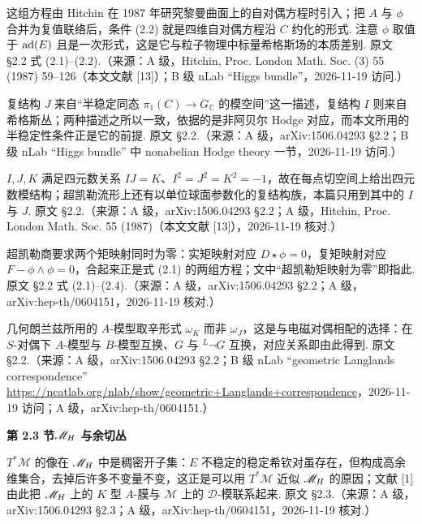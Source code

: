 \begin{description}[leftmargin=5.8em,labelwidth=5em,labelsep=0.6em,itemsep=0.15ex,topsep=0.2ex]
\item[2.2-1] 这组方程由 Hitchin 在 1987 年研究黎曼曲面上的自对偶方程时引入；把 $A$ 与 $\phi$ 合并为复值联络后，条件 (2.2) 就是四维自对偶方程沿 $C$ 约化的形式. 注意 $\phi$ 取值于 ${\mathrm{ad}(E)}$ 且是一次形式，这是它与粒子物理中标量希格斯场的本质差别. 原文 §2.2 式 (2.1)–(2.2).（来源：A 级，Hitchin, Proc. London Math. Soc. (3) 55 (1987) 59–126（本文文献 [13]）；B 级 nLab “Higgs bundle”，2026-11-19 访问.）
\item[2.2-2] 复结构 $J$ 来自“半稳定同态 $\pi_1(C)\to G_{\mathbb C}$ 的模空间”这一描述，复结构 $I$ 则来自希格斯丛；两种描述之所以一致，依据的是非阿贝尔 Hodge 对应，而本文所用的半稳定性条件正是它的前提. 原文 §2.2.（来源：A 级，arXiv:1506.04293 §2.2；B 级 nLab “Higgs bundle” 中 nonabelian Hodge theory 一节，2026-11-19 访问.）
\item[2.2-3] $I,J,K$ 满足四元数关系 $IJ=K$、$I^2=J^2=K^2=-1$，故在每点切空间上给出四元数模结构；超凯勒流形上还有以单位球面参数化的复结构族，本篇只用到其中的 $I$ 与 $J$. 原文 §2.2.（来源：A 级，arXiv:1506.04293 §2.2；A 级，Hitchin, Proc. London Math. Soc. 55 (1987)（本文文献 [13]），2026-11-19 核对.）
\item[2.2-4] 超凯勒商要求两个矩映射同时为零：实矩映射对应 $D\star\phi=0$，复矩映射对应 $F-\phi\wedge\phi=0$，合起来正是式 (2.1) 的两组方程；文中“超凯勒矩映射为零”即指此. 原文 §2.2 式 (2.1)–(2.4).（来源：A 级，arXiv:1506.04293 §2.2；A 级，arXiv:hep-th/0604151，2026-11-19 核对.）
\item[2.2-5] 几何朗兰兹所用的 $A$-模型取辛形式 $\omega_K$ 而非 $\omega_J$，这是与电磁对偶相配的选择：在 $S$-对偶下 $A$-模型与 $B$-模型互换、$G$ 与 $^L\neg G$ 互换，对应关系即由此得到. 原文 §2.2.（来源：A 级，arXiv:1506.04293 §2.2；B 级 nLab “geometric Langlands correspondence” \url{https://ncatlab.org/nlab/show/geometric+Langlands+correspondence}，2026-11-19 访问；A 级，arXiv:hep-th/0604151.）
\end{description}
\medskip\noindent\textbf{第 2.3 节\quad ${{\mathscr{M}}_H}$ 与余切丛}\par\nopagebreak
\begin{description}[leftmargin=5.8em,labelwidth=5em,labelsep=0.6em,itemsep=0.15ex,topsep=0.2ex]
\item[2.3-1] $T^*\mathcal M$ 的像在 ${{\mathscr{M}}_H}$ 中是稠密开子集：$E$ 不稳定的稳定希钦对虽存在，但构成高余维集合，去掉后许多不变量不变，这正是可以用 $T^*\mathcal M$ 近似 ${{\mathscr{M}}_H}$ 的原因；文献 [1] 由此把 ${{\mathscr{M}}_H}$ 上的 $K$ 型 $A$-膜与 $\mathcal M$ 上的 $\mathcal D$-模联系起来. 原文 §2.3.（来源：A 级，arXiv:1506.04293 §2.3；A 级，arXiv:hep-th/0604151，2026-11-19 核对.）
\end{description}
